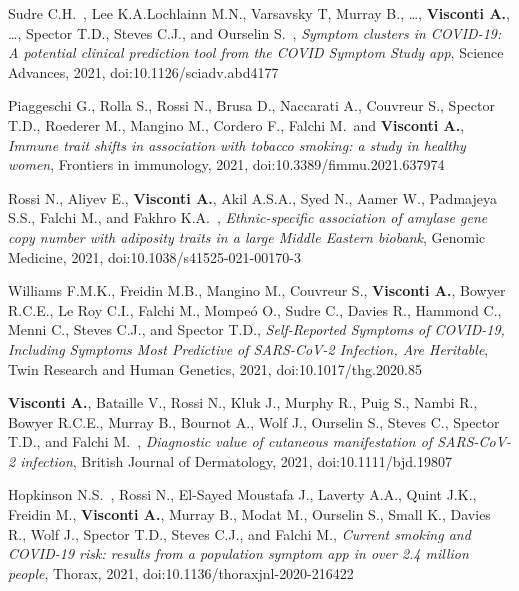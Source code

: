 \begin{itemize}
  		 Sudre C.H.\cofirst ~\corresponding, Lee K.A.\cofirst Lochlainn M.N.\cofirst, Varsavsky T, Murray B., \dots, \textbf{Visconti A.}, \dots, Spector T.D., Steves C.J.\colast, and Ourselin S.\colast ~\corresponding, \emph{Symptom clusters in COVID-19: A potential clinical prediction tool from the COVID Symptom Study app}, Science Advances, 2021, doi:10.1126/sciadv.abd4177  %

		 Piaggeschi G., Rolla S., Rossi N., Brusa D., Naccarati A., Couvreur S., Spector T.D., Roederer M., Mangino M., Cordero F., Falchi M.\colast ~\corresponding and \textbf{Visconti A.}\colast, \emph{Immune trait shifts in association with tobacco smoking: a study in healthy women}, Frontiers in immunology, 2021, doi:10.3389/fimmu.2021.637974 %

	    Rossi N.\cofirst, Aliyev E.\cofirst, \textbf{Visconti A.}, Akil A.S.A., Syed N., Aamer W., Padmajeya S.S., Falchi M.\colast, and Fakhro K.A.\colast ~\corresponding, \emph{Ethnic-specific association of amylase gene copy number with adiposity traits in a large Middle Eastern biobank}, Genomic Medicine, 2021, doi:10.1038/s41525-021-00170-3 %

  	   	Williams F.M.K., Freidin M.B., Mangino M., Couvreur S., \textbf{Visconti A.}, Bowyer R.C.E., Le Roy C.I., Falchi M., Mompe\'o O., Sudre C., Davies R., Hammond C., Menni C., Steves C.J., and Spector T.D.\corresponding, \emph{Self-Reported Symptoms of COVID-19, Including Symptoms Most Predictive of SARS-CoV-2 Infection, Are Heritable}, Twin Research and Human Genetics, 2021, doi:10.1017/thg.2020.85  %

	   \textbf{Visconti A.}\cofirst, Bataille V.\cofirst, Rossi N., Kluk J., Murphy R., Puig S., Nambi R., Bowyer R.C.E., Murray B., Bournot A., Wolf J., Ourselin S., Steves C., Spector T.D.\colast, and Falchi M.\colast ~\corresponding, \emph{Diagnostic value of cutaneous manifestation of SARS-CoV-2 infection}, British Journal of Dermatology, 2021, doi:10.1111/bjd.19807 

		 Hopkinson N.S.\cofirst ~\corresponding, Rossi N.\cofirst, El-Sayed Moustafa J., Laverty A.A., Quint J.K., Freidin M., \textbf{Visconti A.}, Murray B., Modat M., Ourselin S., Small K., Davies R., Wolf J., Spector T.D., Steves C.J.\colast, and Falchi M.\colast, \emph{Current smoking and COVID-19 risk: results from a population symptom app in over 2.4 million people}, Thorax, 2021, doi:10.1136/thoraxjnl-2020-216422  %
		

\end{itemize}
